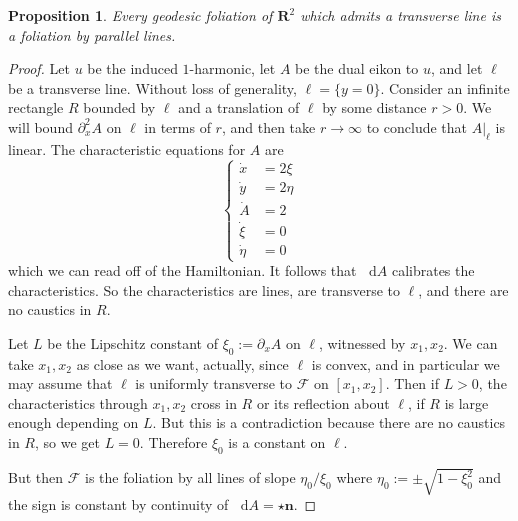 \documentclass[reqno,11pt]{amsart}
\newcommand{\RR}{\mathbf{R}}
\newcommand*\dif{\mathop{}\!\mathrm{d}}
\newcommand{\normal}{\mathbf n}
\newtheorem{proposition}[theorem]{Proposition}
\theoremstyle{definition}
\numberwithin{equation}{section}
\begin{document}
\begin{proposition}
Every geodesic foliation of $\RR^2$ which admits a transverse line is a foliation by parallel lines.
\end{proposition}
\begin{proof}
Let $u$ be the induced $1$-harmonic, let $A$ be the dual eikon to $u$, and let $\ell$ be a transverse line.
Without loss of generality, $\ell = \{y = 0\}$.
Consider an infinite rectangle $R$ bounded by $\ell$ and a translation of $\ell$ by some distance $r > 0$.
We will bound $\partial_x^2 A$ on $\ell$ in terms of $r$, and then take $r \to \infty$ to conclude that $A|_\ell$ is linear.
The characteristic equations for $A$ are 
$$\begin{cases}
    \dot x &= 2\xi \\
    \dot y &= 2\eta \\
    \dot A &= 2 \\
    \dot \xi &= 0 \\
    \dot \eta &= 0
\end{cases}$$
which we can read off of the Hamiltonian.
It follows that $\dif A$ calibrates the characteristics.
So the characteristics are lines, are transverse to $\ell$, and there are no caustics in $R$.

Let $L$ be the Lipschitz constant of $\xi_0 := \partial_x A$ on $\ell$, witnessed by $x_1, x_2$.
We can take $x_1, x_2$ as close as we want, actually, since $\ell$ is convex, and in particular we may assume that $\ell$ is uniformly transverse to $\mathscr F$ on $[x_1, x_2]$.
Then if $L > 0$, the characteristics through $x_1, x_2$ cross in $R$ or its reflection about $\ell$, if $R$ is large enough depending on $L$.
But this is a contradiction because there are no caustics in $R$, so we get $L = 0$.
Therefore $\xi_0$ is a constant on $\ell$.

But then $\mathscr F$ is the foliation by all lines of slope $\eta_0/\xi_0$ where $\eta_0 := \pm \sqrt{1 - \xi_0^2}$ and the sign is constant by continuity of $\dif A = \star \normal$.
\end{proof}



\printbibliography
\end{document}
